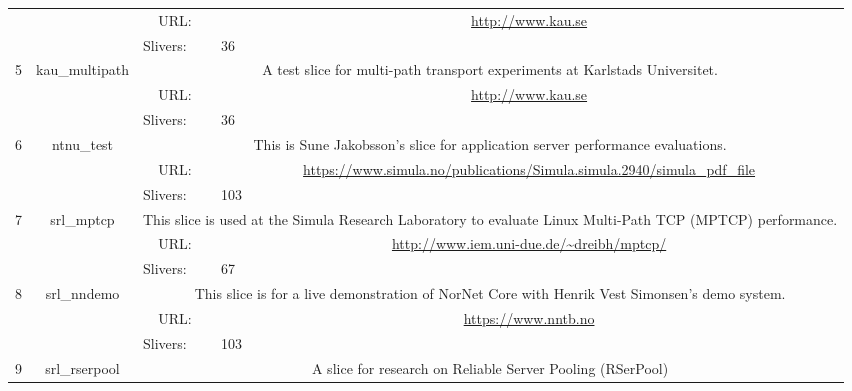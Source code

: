\begin{small}
\begin{center}
\begin{longtable}{|c|c|c|c|}
  &  & \multicolumn{1}{|p{5em}|}{URL:} & \multicolumn{1}{|p{22.5em}|}{\url{http://www.kau.se}} \\* \cline{3-3}\cline{4-4}
  &  & \multicolumn{1}{|l|}{Slivers:} & \multicolumn{1}{|l|}{36} \\ \hline
 \multirow{3}{*}{5} & \multirow{3}{*}{\index{kau\_multipath}\index{Slice!kau\_multipath}kau\_multipath} & \multicolumn{2}{|p{30em}|}{A test slice for multi-path transport experiments at Karlstads Universitet.} \\* \cline{3-3}\cline{4-4}
  &  & \multicolumn{1}{|p{5em}|}{URL:} & \multicolumn{1}{|p{22.5em}|}{\url{http://www.kau.se}} \\* \cline{3-3}\cline{4-4}
  &  & \multicolumn{1}{|l|}{Slivers:} & \multicolumn{1}{|l|}{36} \\ \hline
 \multirow{3}{*}{6} & \multirow{3}{*}{\index{ntnu\_test}\index{Slice!ntnu\_test}ntnu\_test} & \multicolumn{2}{|p{30em}|}{This is Sune Jakobsson's slice for application server performance evaluations.} \\* \cline{3-3}\cline{4-4}
  &  & \multicolumn{1}{|p{5em}|}{URL:} & \multicolumn{1}{|p{22.5em}|}{\url{https://www.simula.no/publications/Simula.simula.2940/simula_pdf_file}} \\* \cline{3-3}\cline{4-4}
  &  & \multicolumn{1}{|l|}{Slivers:} & \multicolumn{1}{|l|}{103} \\ \hline
 \multirow{3}{*}{7} & \multirow{3}{*}{\index{srl\_mptcp}\index{Slice!srl\_mptcp}srl\_mptcp} & \multicolumn{2}{|p{30em}|}{This slice is used at the Simula Research Laboratory to evaluate Linux Multi-Path TCP (MPTCP) performance.} \\* \cline{3-3}\cline{4-4}
  &  & \multicolumn{1}{|p{5em}|}{URL:} & \multicolumn{1}{|p{22.5em}|}{\url{http://www.iem.uni-due.de/~dreibh/mptcp/}} \\* \cline{3-3}\cline{4-4}
  &  & \multicolumn{1}{|l|}{Slivers:} & \multicolumn{1}{|l|}{67} \\ \hline
 \multirow{3}{*}{8} & \multirow{3}{*}{\index{srl\_nndemo}\index{Slice!srl\_nndemo}srl\_nndemo} & \multicolumn{2}{|p{30em}|}{This slice is for a live demonstration of NorNet Core with Henrik Vest Simonsen's demo system.} \\* \cline{3-3}\cline{4-4}
  &  & \multicolumn{1}{|p{5em}|}{URL:} & \multicolumn{1}{|p{22.5em}|}{\url{https://www.nntb.no}} \\* \cline{3-3}\cline{4-4}
  &  & \multicolumn{1}{|l|}{Slivers:} & \multicolumn{1}{|l|}{103} \\ \hline
 \multirow{3}{*}{9} & \multirow{3}{*}{\index{srl\_rserpool}\index{Slice!srl\_rserpool}srl\_rserpool} & \multicolumn{2}{|p{30em}|}{A slice for research on Reliable Server Pooling (RSerPool)} \\* \cline{3-3}\cline{4-4}

\end{longtable}
\end{center}
\end{small}
